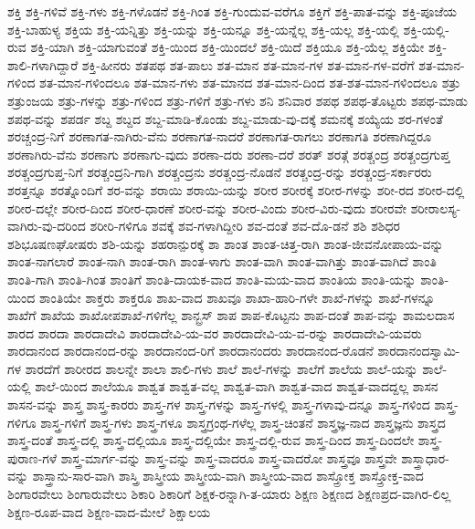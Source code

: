 {ಶಕ್ತಿ
ಶಕ್ತಿ-ಗಳಿವೆ
ಶಕ್ತಿ-ಗಳು
ಶಕ್ತಿ-ಗಳೊಡನೆ
ಶಕ್ತಿ-ಗಿಂತ
ಶಕ್ತಿ-ಗುಂದುವ-ವರೆಗೂ
ಶಕ್ತಿಗೆ
ಶಕ್ತಿ-ಪಾತ-ವನ್ನು
ಶಕ್ತಿ-ಪೂಜೆಯ
ಶಕ್ತಿ-ಬಾಹುಳ್ಯ
ಶಕ್ತಿಯ
ಶಕ್ತಿ-ಯನ್ನಿತ್ತು
ಶಕ್ತಿ-ಯನ್ನು
ಶಕ್ತಿ-ಯನ್ನೂ
ಶಕ್ತಿ-ಯನ್ನೆಲ್ಲ
ಶಕ್ತಿ-ಯಲ್ಲ
ಶಕ್ತಿ-ಯಲ್ಲಿ
ಶಕ್ತಿ-ಯಲ್ಲಿ-ರುವ
ಶಕ್ತಿ-ಯಾಗಿ
ಶಕ್ತಿ-ಯಾಗುವಂತೆ
ಶಕ್ತಿ-ಯಿಂದ
ಶಕ್ತಿ-ಯಿಂದಲೆ
ಶಕ್ತಿ-ಯಿದೆ
ಶಕ್ತಿಯೂ
ಶಕ್ತಿ-ಯೆಲ್ಲ
ಶಕ್ತಿಯೇ
ಶಕ್ತಿ-ಶಾಲಿ-ಗಳಾಗಿದ್ದಾರೆ
ಶಕ್ತಿ-ಹೀನರು
ಶತಪಥ
ಶತ-ಪಾಲು
ಶತ-ಮಾನ
ಶತ-ಮಾನ-ಗಳ
ಶತ-ಮಾನ-ಗಳ-ವರೆಗೆ
ಶತ-ಮಾನ-ಗಳಿಂದ
ಶತ-ಮಾನ-ಗಳಿಂದಲೂ
ಶತ-ಮಾನ-ಗಳು
ಶತ-ಮಾನದ
ಶತ-ಮಾನ-ದಿಂದ
ಶತ-ಶತ-ಮಾನ-ಗಳಿಂದಲೂ
ಶತ್ರು
ಶತ್ರುಂಜಯ
ಶತ್ರು-ಗಳನ್ನು
ಶತ್ರು-ಗಳಿಂದ
ಶತ್ರು-ಗಳಿಗೆ
ಶತ್ರು-ಗಳು
ಶನಿ
ಶನಿವಾರ
ಶಪಥ
ಶಪಥ-ತೊಟ್ಟರು
ಶಪಥ-ಮಾಡು
ಶಪಥ-ವನ್ನು
ಶಪರ್ಡ
ಶಬ್ದ
ಶಬ್ದದ
ಶಬ್ದ-ಮಾಡಿ-ಕೊಂಡು
ಶಬ್ದ-ಮಾಡು-ವು-ದಕ್ಕೆ
ಶಮನಕ್ಕೆ
ಶಯ್ಯೆಯ
ಶರ-ಗಳಂತೆ
ಶರಚ್ಚಂದ್ರ-ನಿಗೆ
ಶರಣಾಗತ-ನಾಗಿರು-ವೆನು
ಶರಣಾಗತ-ನಾದರೆ
ಶರಣಾಗತ-ರಾಗಲು
ಶರಣಾಗತಿ
ಶರಣಾಗಿದ್ದರೂ
ಶರಣಾಗಿರು-ವೆನು
ಶರಣಾಗು
ಶರಣಾಗು-ವುದು
ಶರಣಾ-ದರು
ಶರಣಾ-ದರೆ
ಶರತ್
ಶರತ್ಗೆ
ಶರತ್ಚಂದ್ರ
ಶರತ್ಚಂದ್ರಗುಪ್ತ
ಶರತ್ಚಂದ್ರಗುಪ್ತ-ನಿಗೆ
ಶರತ್ಚಂದ್ರನಿ-ಗಾಗಿ
ಶರತ್ಚಂದ್ರನು
ಶರತ್ಚಂದ್ರ-ನೊಡನೆ
ಶರತ್ಚಂದ್ರ-ರನ್ನು
ಶರತ್ಚಂದ್ರ-ಸರ್ಕಾರರು
ಶರತ್ತನ್ನೂ
ಶರತ್ನೊಂದಿಗೆ
ಶರ-ವನ್ನು
ಶರಾಯಿ
ಶರಾಯಿ-ಯನ್ನು
ಶರೀರ
ಶರೀರಕ್ಕೆ
ಶರೀರ-ಗಳನ್ನು
ಶರೀ-ರದ
ಶರೀರ-ದಲ್ಲಿ
ಶರೀರ-ದಲ್ಲೇ
ಶರೀರ-ದಿಂದ
ಶರೀರ-ಧಾರಣೆ
ಶರೀರ-ವನ್ನು
ಶರೀರ-ವಿಂದು
ಶರೀರ-ವಿರು-ವುದು
ಶರೀರವೇ
ಶರೀರಾಲಸ್ಯ-ವಾಗಿರು-ವು-ದರಿಂದ
ಶರೀರಿ-ಗಳಿಗೂ
ಶವಕ್ಕೆ
ಶವ-ಗಳಾಗಿದ್ದೀರಿ
ಶವ-ದಂತೆ
ಶವ-ದೊ-ಡನೆ
ಶಶಿ
ಶಶಿಧರ
ಶಶಿಭೂಷಣಘೋಷರು
ಶಶಿ-ಯನ್ನು
ಶಹರಾನ್ಪುರಕ್ಕೆ
ಶಾ
ಶಾಂತ
ಶಾಂತ-ಚಿತ್ತ-ರಾಗಿ
ಶಾಂತ-ಜೀವನೋಪಾಯ-ವನ್ನು
ಶಾಂತ-ನಾಗಲಾರೆ
ಶಾಂತ-ನಾಗಿ
ಶಾಂತ-ರಾಗಿ
ಶಾಂತ-ಳಾಗು
ಶಾಂತ-ವಾಗಿ
ಶಾಂತ-ವಾಗಿತ್ತು
ಶಾಂತ-ವಾಗಿದೆ
ಶಾಂತಿ
ಶಾಂತಿ-ಗಾಗಿ
ಶಾಂತಿ-ಗಿಂತ
ಶಾಂತಿಗೆ
ಶಾಂತಿ-ದಾಯಕ-ವಾದ
ಶಾಂತಿ-ಮಯ-ವಾದ
ಶಾಂತಿಯ
ಶಾಂತಿ-ಯನ್ನು
ಶಾಂತಿ-ಯಿಂದ
ಶಾಂತಿಯೇ
ಶಾಕ್ತರು
ಶಾಕ್ತರೂ
ಶಾಖ-ವಾದ
ಶಾಖವೂ
ಶಾಖಾ-ಹಾರಿ-ಗಳೇ
ಶಾಖೆ-ಗಳನ್ನು
ಶಾಖೆ-ಗಳನ್ನೂ
ಶಾಖೆಗೆ
ಶಾಖೆಯ
ಶಾಖೋಪಶಾಖೆ-ಗಳಿಗೆಲ್ಲ
ಶಾನ್ಬ್ರಸ್
ಶಾಪ
ಶಾಪ-ಕೊಟ್ಟನು
ಶಾಪ-ದಂತೆ
ಶಾಪ-ವನ್ನು
ಶಾಮಲದಾಸ
ಶಾರದ
ಶಾರದಾ
ಶಾರದಾದೇವಿ
ಶಾರದಾದೇವಿ-ಯ-ವರ
ಶಾರದಾದೇವಿ-ಯ-ವ-ರನ್ನು
ಶಾರದಾದೇವಿ-ಯವರು
ಶಾರದಾನಂದ
ಶಾರದಾನಂದ-ರನ್ನು
ಶಾರದಾನಂದ-ರಿಗೆ
ಶಾರದಾನಂದರು
ಶಾರದಾನಂದ-ರೊಡನೆ
ಶಾರದಾನಂದಸ್ವಾಮಿ-ಗಳ
ಶಾರದೆಗೆ
ಶಾರೀರದ
ಶಾಲನ್ನೇ
ಶಾಲಾ
ಶಾಲಿ-ಗಳು
ಶಾಲೆ
ಶಾಲೆ-ಗಳನ್ನು
ಶಾಲೆಗೆ
ಶಾಲೆಯ
ಶಾಲೆ-ಯನ್ನು
ಶಾಲೆ-ಯಲ್ಲಿ
ಶಾಲೆ-ಯಿಂದ
ಶಾಲೆಯೂ
ಶಾಶ್ವತ
ಶಾಶ್ವತ-ವಲ್ಲ
ಶಾಶ್ವತ-ವಾಗಿ
ಶಾಶ್ವತ-ವಾದ
ಶಾಶ್ವತ-ವಾದದ್ದಲ್ಲ
ಶಾಸನ
ಶಾಸನ-ವನ್ನು
ಶಾಸ್ತ್ರ
ಶಾಸ್ತ್ರ-ಕಾರರು
ಶಾಸ್ತ್ರ-ಗಳ
ಶಾಸ್ತ್ರ-ಗಳನ್ನು
ಶಾಸ್ತ್ರ-ಗಳಲ್ಲಿ
ಶಾಸ್ತ್ರ-ಗಳಾವು-ದನ್ನೂ
ಶಾಸ್ತ್ರ-ಗಳಿಂದ
ಶಾಸ್ತ್ರ-ಗಳಿಗೂ
ಶಾಸ್ತ್ರ-ಗಳಿಗೆ
ಶಾಸ್ತ್ರ-ಗಳು
ಶಾಸ್ತ್ರ-ಗಳೂ
ಶಾಸ್ತ್ರಗ್ರಂಥ-ಗಳೆಲ್ಲ
ಶಾಸ್ತ್ರ-ಚಿಂತನೆ
ಶಾಸ್ತ್ರಜ್ಞ-ನಾದ
ಶಾಸ್ತ್ರಜ್ಞನು
ಶಾಸ್ತ್ರದ
ಶಾಸ್ತ್ರ-ದಂತೆ
ಶಾಸ್ತ್ರ-ದಲ್ಲಿ
ಶಾಸ್ತ್ರ-ದಲ್ಲಿಯೂ
ಶಾಸ್ತ್ರ-ದಲ್ಲಿಯೇ
ಶಾಸ್ತ್ರ-ದಲ್ಲಿ-ರುವ
ಶಾಸ್ತ್ರ-ದಿಂದ
ಶಾಸ್ತ್ರ-ದಿಂದಲೇ
ಶಾಸ್ತ್ರ-ಪುರಾಣ-ಗಳೆ
ಶಾಸ್ತ್ರ-ಮಾರ್ಗ-ವನ್ನು
ಶಾಸ್ತ್ರ-ವನ್ನು
ಶಾಸ್ತ್ರ-ವಾದರೂ
ಶಾಸ್ತ್ರ-ವಾದರೋ
ಶಾಸ್ತ್ರವೂ
ಶಾಸ್ತ್ರವೇ
ಶಾಸ್ತ್ರಾಧಾರ-ವನ್ನು
ಶಾಸ್ತ್ರಾನು-ಸಾರ-ವಾಗಿ
ಶಾಸ್ತ್ರಿ
ಶಾಸ್ತ್ರೀಯ
ಶಾಸ್ತ್ರೀಯ-ವಾಗಿ
ಶಾಸ್ತ್ರೀಯ-ವಾದ
ಶಾಸ್ತ್ರೋಕ್ತ
ಶಾಸ್ತ್ರೋಕ್ತ-ವಾದ
ಶಿಂಗಾರವೇಲು
ಶಿಂಗಾರುವೇಲು
ಶಿಕಾರಿ
ಶಿಕಾರಿಗೆ
ಶಿಕ್ಷಕ-ರನ್ನಾಗಿ-ತ-ಯಾರು
ಶಿಕ್ಷಣ
ಶಿಕ್ಷಣದ
ಶಿಕ್ಷಣಪ್ರದ-ವಾಗಿರ-ಲಿಲ್ಲ
ಶಿಕ್ಷಣ-ರೂಪ-ವಾದ
ಶಿಕ್ಷಣ-ವಾದ-ಮೇಲೆ
ಶಿಕ್ಷಾಲಯ
}
